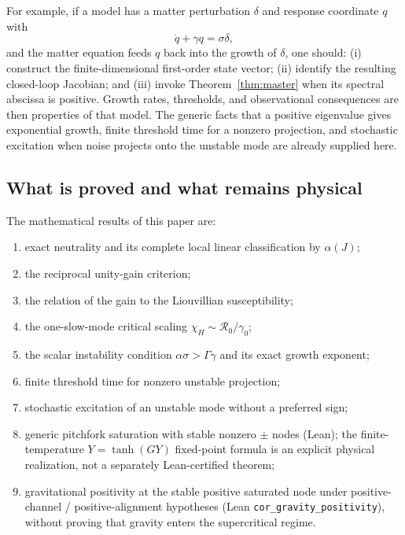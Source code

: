 \documentclass[11pt]{article}
\theoremstyle{definition}
\theoremstyle{remark}
\begin{document}
For example, if a model has a matter perturbation $\delta$ and response coordinate $q$ with
\begin{equation}
 \dot q+\gamma q=\sigma\delta,
\end{equation}
and the matter equation feeds $q$ back into the growth of $\delta$, one should: (i) construct the finite-dimensional first-order state vector; (ii) identify the resulting closed-loop Jacobian; and (iii) invoke Theorem~\ref{thm:master} when its spectral abscissa is positive.  Growth rates, thresholds, and observational consequences are then properties of that model.  The generic facts that a positive eigenvalue gives exponential growth, finite threshold time for a nonzero projection, and stochastic excitation when noise projects onto the unstable mode are already supplied here.

\subsection{What is proved and what remains physical}
The mathematical results of this paper are:
\begin{enumerate}
 \item exact neutrality and its complete local linear classification by $\alpha(J)$;
 \item the reciprocal unity-gain criterion;
 \item the relation of the gain to the Liouvillian susceptibility;
 \item the one-slow-mode critical scaling $\chi_H\sim\mathcal R_0/\gamma_0$;
 \item the scalar instability condition $\alpha\sigma>\Gamma\gamma$ and its exact growth exponent;
 \item finite threshold time for nonzero unstable projection;
 \item stochastic excitation of an unstable mode without a preferred sign;
 \item generic pitchfork saturation with stable nonzero $\pm$ nodes (Lean); the finite-temperature $Y=\tanh(GY)$ fixed-point formula is an explicit physical realization, not a separately Lean-certified theorem;
 \item gravitational positivity at the stable positive saturated node under positive-channel / positive-alignment hypotheses (Lean \texttt{cor\_gravity\_positivity}), without proving that gravity enters the supercritical regime.
\end{enumerate}
\end{document}
